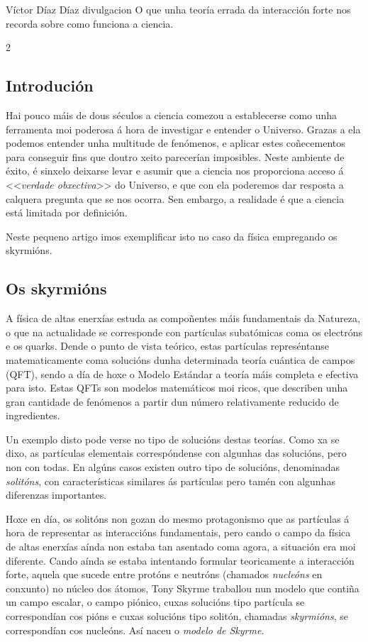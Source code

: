 {Víctor Díaz Díaz}
{divulgacion}
{O que unha teoría errada da interacción forte nos recorda sobre como funciona
a ciencia.}

\begin{multicols}{2}

\subsection*{Introdución}

Hai pouco máis de dous séculos a ciencia comezou a establecerse como unha
ferramenta moi poderosa á hora de investigar e entender o Universo. Grazas a
ela podemos entender unha multitude de fenómenos, e aplicar estes coñecementos
para conseguir fins que doutro xeito parecerían imposibles. Neste ambiente de
éxito, é sinxelo deixarse levar e asumir que a ciencia nos proporciona acceso á
<<\textit{verdade obxectiva}>> do Universo, e que con ela poderemos dar resposta a
calquera pregunta que se nos ocorra. Sen embargo, a realidade é que a ciencia
está limitada por definición.

Neste pequeno artigo imos exemplificar isto no caso da física empregando os
skyrmións.

\subsection*{Os skyrmións}

A física de altas enerxías estuda as compoñentes máis fundamentais da Natureza,
o que na actualidade se corresponde con partículas subatómicas coma os
electróns e os quarks. Dende o punto de vista teórico, estas partículas
represéntanse matematicamente coma solucións dunha determinada teoría cuántica
de campos (QFT), sendo a día de hoxe o Modelo Estándar a teoría máis completa e
efectiva para isto. Estas QFTs son modelos matemáticos moi ricos, que describen
unha gran cantidade de fenómenos a partir dun número relativamente reducido de
ingredientes.

Un exemplo disto pode verse no tipo de solucións destas teorías. Como xa se
dixo, as partículas elementais correspóndense con algunhas das solucións, pero
non con todas. En algúns casos existen outro tipo de solucións, denominadas
\textit{solitóns}, con características similares ás partículas pero tamén con
algunhas diferenzas importantes.


Hoxe en día, os solitóns non gozan do mesmo protagonismo que as partículas á
hora de representar as interaccións fundamentais, pero cando o campo da física
de altas enerxías aínda non estaba tan asentado coma agora, a situación era moi
diferente. Cando aínda se estaba intentando formular teoricamente a interacción
forte, aquela que sucede entre protóns e neutróns (chamados \textit{nucleóns}
en conxunto) no núcleo dos átomos, Tony Skyrme traballou nun modelo que contiña
un campo escalar, o campo piónico, cuxas solucións tipo partícula se
correspondían cos pións e cuxas solucións tipo solitón, chamadas
\textit{skyrmións}, se correspondían cos nucleóns. Así naceu o \textit{modelo
de Skyrme}.


\end{multicols}
